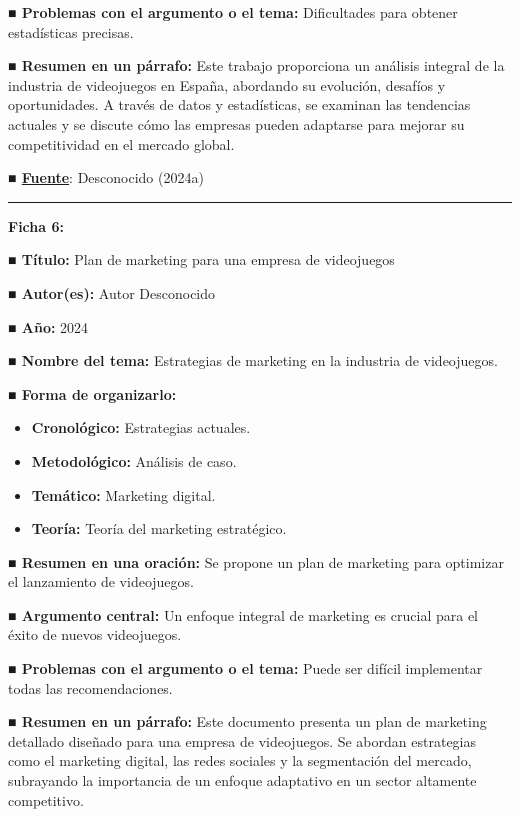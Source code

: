\documentclass[
  letterpaper,
  DIV=11,
  numbers=noendperiod]{scrreprt}
\begin{document}
\textbf{■ Problemas con el argumento o el tema:} Dificultades para
obtener estadísticas precisas.

\textbf{■ Resumen en un párrafo:} Este trabajo proporciona un análisis
integral de la industria de videojuegos en España, abordando su
evolución, desafíos y oportunidades. A través de datos y estadísticas,
se examinan las tendencias actuales y se discute cómo las empresas
pueden adaptarse para mejorar su competitividad en el mercado global.

\textbf{■
\href{https://riunet.upv.es/bitstream/handle/10251/45702/Trabajo\%20final\%20carrera.pdf}{Fuente}}:
Desconocido (2024a)

\begin{center}\rule{0.5\linewidth}{0.5pt}\end{center}

\textbf{Ficha 6:}

\textbf{■ Título:} Plan de marketing para una empresa de videojuegos

\textbf{■ Autor(es):} Autor Desconocido

\textbf{■ Año:} 2024

\textbf{■ Nombre del tema:} Estrategias de marketing en la industria de
videojuegos.

\textbf{■ Forma de organizarlo:}

\begin{itemize}
\item
  \textbf{Cronológico:} Estrategias actuales.
\item
  \textbf{Metodológico:} Análisis de caso.
\item
  \textbf{Temático:} Marketing digital.
\item
  \textbf{Teoría:} Teoría del marketing estratégico.
\end{itemize}

\textbf{■ Resumen en una oración:} Se propone un plan de marketing para
optimizar el lanzamiento de videojuegos.

\textbf{■ Argumento central:} Un enfoque integral de marketing es
crucial para el éxito de nuevos videojuegos.

\textbf{■ Problemas con el argumento o el tema:} Puede ser difícil
implementar todas las recomendaciones.

\textbf{■ Resumen en un párrafo:} Este documento presenta un plan de
marketing detallado diseñado para una empresa de videojuegos. Se abordan
estrategias como el marketing digital, las redes sociales y la
segmentación del mercado, subrayando la importancia de un enfoque
adaptativo en un sector altamente competitivo.
\end{document}
